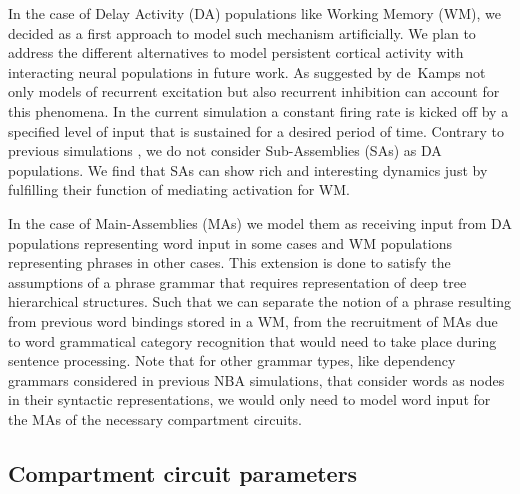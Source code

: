 \documentclass[10pt]{article}
\begin{document}
In the case of Delay Activity (DA) populations like Working Memory (WM), we decided as a first approach to model such mechanism artificially.
We plan to address the different alternatives to model persistent cortical activity with interacting neural populations in future work.
As suggested by de~Kamps\cite{de_Kamps_2005} not only models of recurrent excitation but also recurrent inhibition can account for this phenomena.
In the current simulation a constant firing rate is kicked off by a specified level of input that is sustained for a desired period of time.
Contrary to previous simulations \cite{velde2015ambiguity}, we do not consider Sub-Assemblies (SAs) as DA populations.
We find that SAs can show rich and interesting dynamics just by fulfilling their function of mediating activation for WM.

In the case of Main-Assemblies (MAs) we model them as receiving input from DA populations representing word input in some cases and WM populations representing phrases in other cases.
This extension is done to satisfy the assumptions of a phrase grammar that requires representation of deep tree hierarchical structures. Such that we can separate the notion of a phrase resulting from previous word bindings stored in a WM, from the recruitment of MAs due to word grammatical category recognition that would need to take place during sentence processing.
Note that for other grammar types, like dependency grammars considered in previous NBA simulations\cite{velde2015ambiguity}, that consider words as nodes in their syntactic representations, we would only need to model word input for the MAs of the necessary compartment circuits.


\subsection{Compartment circuit parameters}\label{compartment-circuit-parameters}
\end{document}

